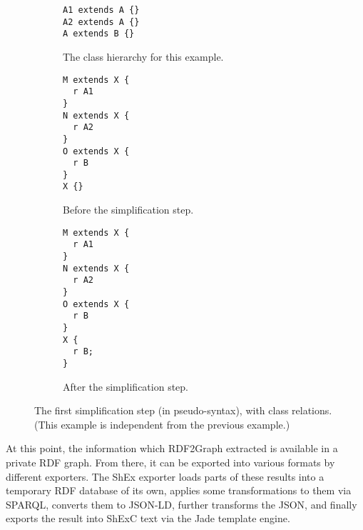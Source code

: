 \begin{figure}[h]
  \begin{subfigure}[t]{0.3\textwidth}
    \begin{lstlisting}
A1 extends A {}
A2 extends A {}
A extends B {}
    \end{lstlisting}
    \caption{The class hierarchy for this example.}
    \label{fig:simplify-7.4.2-classes-hierarchy}
  \end{subfigure}
  \begin{subfigure}[t]{0.3\textwidth}
    \begin{lstlisting}
M extends X {
  r A1
}
N extends X {
  r A2
}
O extends X {
  r B
}
X {}
    \end{lstlisting}
    \caption{Before the simplification step.}
    \label{fig:simplify-7.4.2-classes-before}
  \end{subfigure}
  \begin{subfigure}[t]{0.3\textwidth}
    \begin{lstlisting}
M extends X {
  r A1
}
N extends X {
  r A2
}
O extends X {
  r B
}
X {
  r B;
}
    \end{lstlisting}
    \caption{After the simplification step.}
    \label{fig:simplify-7.4.2-classes-after}
  \end{subfigure}
  \caption{
    The first simplification step (in pseudo-syntax), with class relations.
    (This example is independent from the previous example.)
  }
  \label{fig:simplify-7.4.2-classes}
\end{figure}

At this point, the information which RDF2Graph extracted is available in a private RDF graph.
From there, it can be exported into various formats by different exporters.
The ShEx exporter loads parts of these results into a temporary RDF database of its own,
applies some transformations to them via SPARQL,
converts them to JSON-LD,
further transforms the JSON,
and finally exports the result into ShExC text via the Jade template engine.

